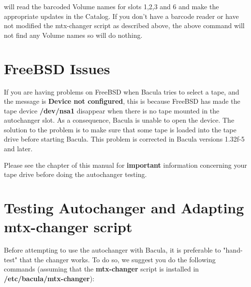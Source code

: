 will read the barcoded Volume names for slots 1,2,3 and 6 and make the
appropriate updates in the Catalog. If you don't have a barcode reader or have
not modified the mtx-changer script as described above, the above command will
not find any Volume names so will do nothing. 
\label{FreeBSD}

\section{FreeBSD Issues}

If you are having problems on FreeBSD when Bacula tries to select a tape, and
the message is {\bf Device not configured}, this is because FreeBSD has made
the tape device {\bf /dev/nsa1} disappear when there is no tape mounted in the
autochanger slot. As a consequence, Bacula is unable to open the device. The
solution to the problem is to make sure that some tape is loaded into the tape
drive before starting Bacula. This problem is corrected in Bacula versions
1.32f-5 and later. 

Please see the 
 chapter of this manual for
{\bf important} information concerning your tape drive before doing the
autochanger testing. 
\label{AutochangerTesting}

\section{Testing Autochanger and Adapting mtx-changer script}


Before attempting to use the autochanger with Bacula, it is preferable to
"hand-test" that the changer works. To do so, we suggest you do the
following commands (assuming that the {\bf mtx-changer} script is installed in
{\bf /etc/bacula/mtx-changer}): 

